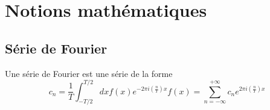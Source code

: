 \documentclass[../notesdecours.tex]{subfiles}
\begin{document}
\chapter{Notions mathématiques}
\section{Série de Fourier}
Une série de Fourier est une série de la forme
\begin{subequations}
\begin{equation}
c_n = \frac{1}{T} \int^{T/2}_{-T/2} dx f(x)e^{-2\pi i(\frac{n}{T})x}
\end{equation}
\begin{equation}
f(x) = \sum_{n = -\infty}^{+\infty}c_ne^{2\pi i (\frac{n}{T})x}
\end{equation}
\end{subequations}
\end{document}
